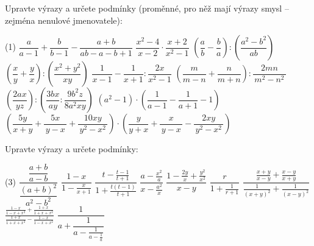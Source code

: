 \documentclass[12pt,a4paper]{article}
\begin{document}
\setcounter{section}{3}
\begin{exercise}
    Upravte výrazy a určete podmínky (proměnné, pro něž mají výrazy smysl – zejména nenulové jmenovatele):
    \begin{tasks}(1)
        \task \(\displaystyle \dfrac{a}{a-1} + \dfrac{b}{b-1} - \dfrac{a+b}{ab - a - b + 1}\)
        \task \(\displaystyle \dfrac{x^2 - 4}{x - 2}\cdot\dfrac{x+2}{x^2 - 1}\)
        \task \(\displaystyle \left(\dfrac{a}{b} - \dfrac{b}{a}\right) : \left(\dfrac{a^2 - b^2}{ab}\right)\)
        \task \(\displaystyle \left(\dfrac{x}{y} + \dfrac{y}{x}\right) : \left(\dfrac{x^2 + y^2}{xy}\right)\)
        \task \(\displaystyle \dfrac{1}{x-1} - \dfrac{1}{x+1} : \dfrac{2x}{x^2 - 1}\)
        \task \(\displaystyle \left(\dfrac{m}{m-n} + \dfrac{n}{m+n}\right) : \dfrac{2mn}{\,m^2 - n^2\,}\)
        \task $\left(\dfrac{2ax}{yz}\right) : \left( \dfrac{3bx}{ay} : \dfrac{9b^{2}z}{8a^{2}xy} \right)$
        \task $(a^2 - 1)\cdot\left(\dfrac{1}{a-1} - \dfrac{1}{a+1} - 1\right)$
        \task $\left( \dfrac{5y}{x+y} + \dfrac{5x}{\,y-x\,} + \dfrac{10xy}{\,y^{2}-x^{2}\,} \right)\cdot
               \left( \dfrac{y}{y+x} + \dfrac{x}{\,y-x\,} - \dfrac{2xy}{\,y^{2}-x^{2}\,} \right)$
        
    \end{tasks}
\end{exercise}


\begin{exercise}
    Upravte výrazy a určete podmínky:
    \begin{tasks}(3)
        \task \(\displaystyle \dfrac{\dfrac{a+b}{a-b}}{\dfrac{(a+b)^2}{a^2-b^2}}\)
        \task $\dfrac{1-x}{1- \frac{x}{x+1}}$
        \task $\dfrac{t- \frac{t-1}{t+1}}{1+ \frac{t\left(t-1\right)}{t+1}}$
        \task $\dfrac{a- \frac{x^2}{a}}{x- \frac{a^2}{x}}$
        \task $\dfrac{1- \frac{2y}{x} + \frac{y^2}{x^2}}{x-y}$
        \task $\dfrac{r}{1+ \frac{1}{r+1}}$
        \task $\dfrac{\frac{x+y}{x-y}+\frac{x-y}{x+y}}{\frac{1}{\left(x+y\right)^2} + \frac{1}{\left(x-y\right)^2}}$
        \task $\frac{\frac{1-x}{1-x+x^2} + \frac{1+x}{1+x+x^2}}{\frac{1+x}{1+x+x^2} - \frac{1-x}{1-x+x^2}}$
        \task $\dfrac{1}{a+ \dfrac{1}{a- \tfrac{1}{a- \frac{1}{a}}}}$
    \end{tasks}
\end{exercise}
\end{document}
